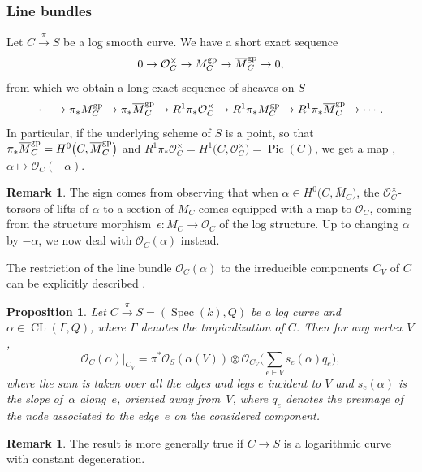 \documentclass[11pt]{article}
\numberwithin{equation}{section}
\newcommand{\Pic}{\operatorname{Pic}}
\renewcommand{\O}{\mathcal{O}}
\numberwithin{equation}{section}
\newtheorem{prop}[theo]{Proposition}
\theoremstyle{definition}
\newtheorem{remarkk}[theo]{Remark}
\begin{document}
\subsubsection{Line bundles}
Let $C\xrightarrow{\pi} S$ be a log smooth curve. We have a short exact sequence
\begin{equation}\label{eq:logseq}
0\to\mathcal O_C^{\times}\to M_C^{\rm gp}\to\overline{M}_C^{\rm gp}\to 0,\end{equation}
from which we obtain a long exact sequence of sheaves on $S$
\begin{align*}
 \cdots\to \pi_*M_C^{\rm gp}\to\pi_*\overline{M}_C^{\rm gp}\to
 R^1\pi_*\mathcal O_C^{\times}\to
 R^1\pi_*M_C^{\rm gp}\to R^1\pi_*\overline{M}_C^{\rm gp}\to\cdots.
\end{align*}
In particular, if the underlying scheme of $S$ is a point, so that $\pi_*\overline{M}^{\rm gp}_C=H^0\bigl(C,\overline{M}^{\rm gp}_C\bigr)$ and $R^1\pi_*\O_C^\times=H^1\bigl(C,\O_C^\times\bigr)=\Pic(C)$, we get a map
\smash{$
 H^0\bigl(C,\overline{M}_C^{\rm gp}\bigr)\to \Pic^0(C)$}, $
 \alpha \mapsto\mathcal O_C(-\alpha)$.

\begin{remarkk}
 The sign comes from observing that when $\alpha\in H^0\bigl(C,\overline{M}_C\bigr)$, the $\mathcal O_C^{\times}$-torsors of lifts of $\alpha$ to a section of $M_C$ comes equipped with a map to $\mathcal O_C$, coming from the structure morphism~${\epsilon \colon M_C\to\mathcal O_C}$ of the log structure. Up to changing $\alpha$ by $-\alpha$, we now deal with $\O_C(\alpha)$ instead.
\end{remarkk}

The restriction of the line bundle $\mathcal O_C(\alpha)$ to the irreducible components $C_V$ of $C$ can be explicitly described \cite[Proposition~3.3.3]{marcuswiselog}.
\begin{prop}
 Let $C\xrightarrow{\pi} S=(\operatorname{Spec}(k),Q)$ be a log curve and $\alpha\in\operatorname{CL}(\Gamma, Q)$, where $\Gamma$ denotes the tropicalization of $C$. Then for any vertex $V$,
 \[\mathcal O_C(\alpha)\rvert_{C_V}=\pi^*\mathcal O_S(\alpha(V))\otimes\mathcal O_{C_V}\biggl(\sum_{e\vdash V} s_e(\alpha) q_e\biggr),
 \]
where the sum is taken over all the edges and legs $e$ incident to $V$ and $s_e(\alpha)$ is the slope of~$\alpha$ along~$e$, oriented away from~$V$, where $q_e$ denotes the preimage of the node associated to the edge~$e$ on the considered component.
\end{prop}
\begin{remarkk}
 The result is more generally true if $C\to S$ is a logarithmic curve with constant degeneration.
\end{remarkk}
\end{document}
